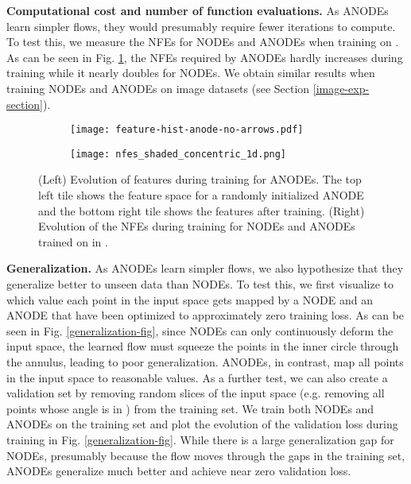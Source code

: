 \documentclass{article}
\begin{document}
\vspace{-10pt}
\textbf{Computational cost and number of function evaluations.} As ANODEs learn simpler flows, they would presumably require fewer iterations to compute. To test this, we measure the NFEs for NODEs and ANODEs when training on . As can be seen in Fig. \ref{nfes-anode-vs-node}, the NFEs required by ANODEs hardly increases during training while it nearly doubles for NODEs. We obtain similar results when training NODEs and ANODEs on image datasets (see Section \ref{image-exp-section}). 

\begin{figure}[t]
\centering
\begin{subfigure}[t]{0.47\linewidth}
\centering
\texttt{[image: feature-hist-anode-no-arrows.pdf]}
\end{subfigure} \hspace{0.05\linewidth}
\begin{subfigure}[t]{0.40\linewidth}
\centering
\texttt{[image: nfes\_shaded\_concentric\_1d.png]}
\end{subfigure}
\setlength{\belowcaptionskip}{-10pt}
\caption{(Left) Evolution of features during training for ANODEs. The top left tile shows the feature space for a randomly initialized ANODE and the bottom right tile shows the features after training. (Right) Evolution of the NFEs during training for NODEs and ANODEs trained on  in .}
\label{nfes-anode-vs-node}
\end{figure}

\textbf{Generalization.} As ANODEs learn simpler flows, we also hypothesize that they generalize better to unseen data than NODEs. To test this, we first visualize to which value each point in the input space gets mapped by a NODE and an ANODE that have been optimized to approximately zero training loss. As can be seen in Fig. \ref{generalization-fig}, since NODEs can only continuously deform the input space, the learned flow must squeeze the points in the inner circle through the annulus, leading to poor generalization. ANODEs, in contrast, map all points in the input space to reasonable values. As a further test, we can also create a validation set by removing random slices of the input space (e.g. removing all points whose angle is in ) from the training set. We train both NODEs and ANODEs on the training set and plot the evolution of the validation loss during training in Fig. \ref{generalization-fig}. While there is a large generalization gap for NODEs, presumably because the flow moves through the gaps in the training set, ANODEs generalize much better and achieve near zero validation loss.
\end{document}
